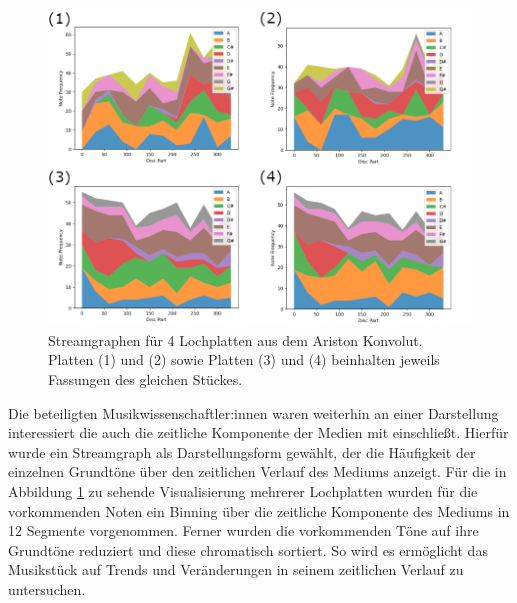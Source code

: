 \begin{figure}[t]
    \centering
    \includegraphics[width=\textwidth]{graphics/streamgraphs.png}
    \caption{Streamgraphen für 4 Lochplatten aus dem Ariston Konvolut. Platten (1) und (2) sowie Platten (3) und (4) beinhalten jeweils Fassungen des gleichen Stückes.}
    \label{streamcharts}
\end{figure}

Die beteiligten Musikwissenschaftler:innen waren weiterhin an einer Darstellung interessiert die auch die zeitliche Komponente der Medien mit einschließt.
Hierfür wurde ein Streamgraph als Darstellungsform gewählt, der die Häufigkeit der einzelnen Grundtöne über den zeitlichen Verlauf des Mediums anzeigt.
Für die in Abbildung \ref{streamcharts} zu sehende Visualisierung mehrerer Lochplatten wurden für die vorkommenden Noten ein Binning über die zeitliche Komponente des Mediums in 12 Segmente vorgenommen.
Ferner wurden die vorkommenden Töne auf ihre Grundtöne reduziert und diese chromatisch sortiert.
So wird es ermöglicht das Musikstück auf Trends und Veränderungen in seinem zeitlichen Verlauf zu untersuchen.

